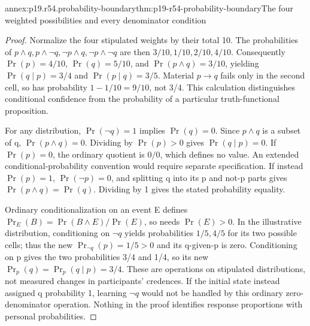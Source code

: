 \begin{annexitem}{annex:p19.r54.probability-boundary}{thm:p19-r54-probability-boundary}{The four weighted possibilities and every denominator condition}
\begin{proof}
Normalize the four stipulated weights by their total 10.
The probabilities of \(p\land q,p\land\neg q,
\neg p\land q,\neg p\land\neg q\) are then
\(3/10,1/10,2/10,4/10\). Consequently
\(\Pr(p)=4/10\), \(\Pr(q)=5/10\), and
\(\Pr(p\land q)=3/10\), yielding
\(\Pr(q\mid p)=3/4\) and \(\Pr(p\mid q)=3/5\).
Material \(p\to q\) fails only in the second cell,
so has probability \(1-1/10=9/10\), not 3/4.
This calculation distinguishes conditional confidence from
the probability of a particular truth-functional proposition.

For any distribution, \(\Pr(\neg q)=1\) implies
\(\Pr(q)=0\). Since \(p\land q\) is a subset of q,
\(\Pr(p\land q)=0\). Dividing by \(\Pr(p)>0\)
gives \(\Pr(q\mid p)=0\). If \(\Pr(p)=0\), the
ordinary quotient is \(0/0\), which defines no value.
An extended conditional-probability convention would require
separate specification. If instead \(\Pr(p)=1\),
\(\Pr(\neg p)=0\), and splitting q into its p and
not-p parts gives \(\Pr(p\land q)=\Pr(q)\).
Dividing by 1 gives the stated probability equality.

Ordinary conditionalization on an event E defines
\(\Pr_E(B)=\Pr(B\land E)/\Pr(E)\), so needs
\(\Pr(E)>0\). In the illustrative distribution,
conditioning on \(\neg q\) yields probabilities
\(1/5,4/5\) for its two possible cells; thus the new
\(\Pr_{\neg q}(p)=1/5>0\) and its q-given-p is zero.
Conditioning on p gives the two probabilities 3/4 and 1/4,
so its new \(\Pr_p(q)=\Pr_p(q\mid p)=3/4\).
These are operations on stipulated distributions, not measured
changes in participants' credences. If the initial state instead
assigned q probability 1, learning \(\neg q\) would not be
handled by this ordinary zero-denominator operation. Nothing
in the proof identifies response proportions with personal probabilities.
\end{proof}
\end{annexitem}

